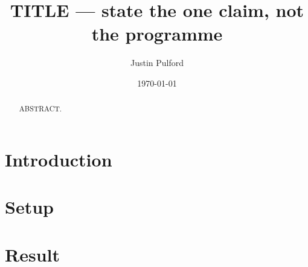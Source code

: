 \documentclass[aps,prd,twocolumn,superscriptaddress,nofootinbib,showpacs]{revtex4-2}
\begin{document}
\title{TITLE --- state the one claim, not the programme}

\author{Justin Pulford}

\date{\today}

\begin{abstract}
ABSTRACT.
\end{abstract}

\maketitle

\section{Introduction}

\section{Setup}

\section{Result}
\end{document}
